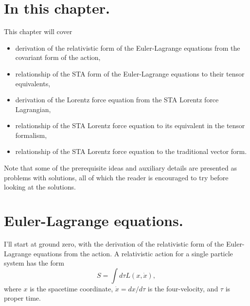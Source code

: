 %
%
\section{In this chapter.}
This chapter will cover
\begin{itemize}
\item derivation of the relativistic form of the Euler-Lagrange equations from the covariant form of the action,
\item relationship of the STA form of the Euler-Lagrange equations to their tensor equivalents,
\item derivation of the Lorentz force equation from the STA Lorentz force Lagrangian,
\item relationship of the STA Lorentz force equation to its equivalent in the tensor formalism,
\item relationship of the STA Lorentz force equation to the traditional vector form.
\end{itemize}
Note that some of the prerequisite ideas and auxiliary details are presented as problems with solutions, all of which the reader is encouraged to try before looking at the solutions.
%
\section{Euler-Lagrange equations.}
I'll start at ground zero, with the derivation of the relativistic form of the Euler-Lagrange equations from the action.
A relativistic action for a single particle system has the form
\begin{equation}\label{eqn:lorentzForceCovariant:20}
S = \int d\tau L(x, \dot{x}),
\end{equation}
where
\( x \) is the spacetime coordinate, \( \dot{x} = dx/d\tau \) is the four-velocity,
and \( \tau \) is proper time.

